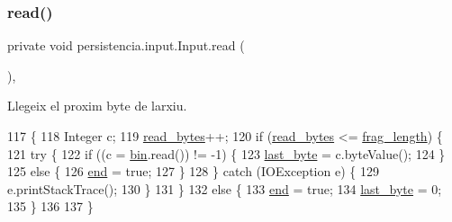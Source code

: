 \subsubsection{\texorpdfstring{read()}{read()}}
{\footnotesize\ttfamily private void persistencia.\+input.\+Input.\+read (\begin{DoxyParamCaption}{ }\end{DoxyParamCaption})\hspace{0.3cm}{\ttfamily [inline]}, {\ttfamily [private]}}



Llegeix el proxim byte de l\textquotesingle{}arxiu. 


\begin{DoxyCode}
117                         \{
118         Integer c;
119         \hyperlink{classpersistencia_1_1input_1_1Input_ace2c934234f82fb07ae169b50f71cd32}{read\_bytes}++;
120         \textcolor{keywordflow}{if} (\hyperlink{classpersistencia_1_1input_1_1Input_ace2c934234f82fb07ae169b50f71cd32}{read\_bytes} <= \hyperlink{classpersistencia_1_1input_1_1Input_adae91120899054fe5200d5e307840042}{frag\_length}) \{
121             \textcolor{keywordflow}{try} \{
122                 \textcolor{keywordflow}{if} ((c = \hyperlink{classpersistencia_1_1input_1_1Input_aa4b622d30a090256ce05c5082cdb0791}{bin}.read()) != -1) \{
123                     \hyperlink{classpersistencia_1_1input_1_1Input_a45d4bdcdb96823fc8ffe5c1a430727f2}{last\_byte} = c.byteValue();
124                 \}
125                 \textcolor{keywordflow}{else} \{
126                     \hyperlink{classpersistencia_1_1input_1_1Input_aa986cd4af0178e1a80f551dcd8936125}{end} = \textcolor{keyword}{true};
127                 \}
128             \} \textcolor{keywordflow}{catch} (IOException e) \{
129                 e.printStackTrace();
130             \}
131         \}
132         \textcolor{keywordflow}{else} \{
133             \hyperlink{classpersistencia_1_1input_1_1Input_aa986cd4af0178e1a80f551dcd8936125}{end} = \textcolor{keyword}{true};
134             \hyperlink{classpersistencia_1_1input_1_1Input_a45d4bdcdb96823fc8ffe5c1a430727f2}{last\_byte} = 0;
135         \}
136 
137     \}
\end{DoxyCode}
\mbox{\label{classpersistencia_1_1input_1_1Input_a619abf26ddafb7a1bde420622d3c7aa5}} 
